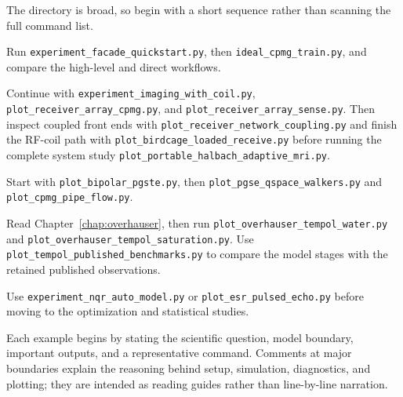 \documentclass[11pt,oneside]{report}
\newcommand{\code}[1]{\texttt{#1}}
\begin{document}
The directory is broad, so begin with a short sequence rather than scanning the
full command list.

\begin{description}
  \raggedright
  \item[First simulation.] Run \code{experiment\_facade\_quickstart.py}, then
  \code{ideal\_cpmg\_train.py}, and compare the high-level and direct workflows.
  \item[Fields, receive arrays, and imaging.] Continue with
  \code{experiment\_imaging\_with\_coil.py},
  \code{plot\_receiver\_array\_cpmg.py}, and
  \code{plot\_receiver\_array\_sense.py}. Then inspect coupled front ends with
  \code{plot\_receiver\_network\_coupling.py} and finish the RF-coil path with
  \code{plot\_birdcage\_loaded\_receive.py} before running the complete system
  study \code{plot\_portable\_halbach\_adaptive\_mri.py}.
  \item[Diffusion and transport.] Start with \code{plot\_bipolar\_pgste.py},
  then \code{plot\_pgse\_qspace\_walkers.py} and
  \code{plot\_cpmg\_pipe\_flow.py}.
  \item[Liquid-state DNP.] Read Chapter~\ref{chap:overhauser}, then run
  \code{plot\_overhauser\_tempol\_water.py} and
  \code{plot\_overhauser\_tempol\_saturation.py}. Use
  \code{plot\_tempol\_published\_benchmarks.py} to compare the model stages
  with the retained published observations.
  \item[NQR or ESR.] Use \code{experiment\_nqr\_auto\_model.py} or
  \code{plot\_esr\_pulsed\_echo.py} before moving to the optimization and
  statistical studies.
\end{description}

Each example begins by stating the scientific question, model boundary,
important outputs, and a representative command. Comments at major boundaries
explain the reasoning behind setup, simulation, diagnostics, and plotting; they
are intended as reading guides rather than line-by-line narration.
\end{document}
